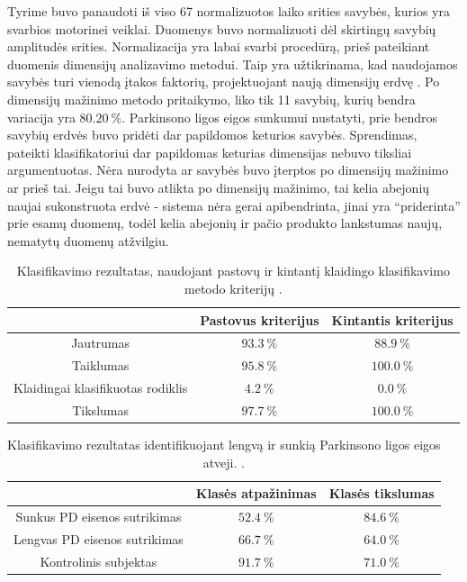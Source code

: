 \documentclass[]{vgtuef}
\begin{document}
Tyrime buvo panaudoti iš viso 67 normalizuotos laiko srities savybės, kurios yra svarbios motorinei veiklai. Duomenys buvo normalizuoti dėl skirtingų savybių amplitudės srities. Normalizacija yra labai svarbi procedūrą, prieš pateikiant duomenis dimensijų analizavimo metodui. Taip yra užtikrinama, kad naudojamos savybės turi vienodą įtakos faktorių, projektuojant naują dimensijų erdvę \cite{824819}. Po dimensijų mažinimo metodo pritaikymo, liko tik 11 savybių, kurių bendra variacija yra $80.20~\%$. Parkinsono ligos eigos sunkumui nustatyti, prie bendros savybių erdvės buvo pridėti dar papildomos keturios savybės. Sprendimas, pateikti klasifikatoriui dar papildomas keturias dimensijas nebuvo tiksliai argumentuotas. Nėra nurodyta ar savybės buvo įterptos po dimensijų mažinimo ar prieš tai. Jeigu tai buvo atlikta po dimensijų mažinimo, tai kelia abejonių naujai sukonstruota erdvė - sistema nėra gerai apibendrinta, jinai yra ``priderinta'' prie esamų duomenų, todėl kelia abejonių ir pačio produkto lankstumas naujų, nematytų duomenų atžvilgiu. 

\begin{table}
	\centering
  \renewcommand{\arraystretch}{1.3}
	\caption{Klasifikavimo rezultatas, naudojant pastovų ir kintantį klaidingo klasifikavimo metodo kriterijų \cite{5627904}.}
	\label{table:wireless_svm_pd_recognition}
	\begin{tabular}{|c|c|c|} \hline
		& Pastovus kriterijus & Kintantis kriterijus \\ \hline
	Jautrumas & $93.3~\%$ & $88.9~\%$ \\ \hline
	Taiklumas & $95.8~\%$ & $100.0~\%$ \\ \hline
	Klaidingai klasifikuotas rodiklis & $4.2~\%$ & $0.0~\%$ \\ \hline
	Tikslumas & $97.7~\%$ & $100.0~\%$ \\ \hline
	\end{tabular}
\end{table}

\begin{table}
	\centering
	\renewcommand{\arraystretch}{1.3}
	\caption{Klasifikavimo rezultatas identifikuojant lengvą ir sunkią Parkinsono ligos eigos atveji. \cite{5627904}.}
	\label{table:wireless_svm_recognition}
	\begin{tabular}{|c|c|c|} \hline
		& Klasės atpažinimas & Klasės tikslumas \\ \hline
	Sunkus PD eisenos sutrikimas & $52.4~\%$ & $84.6~\%$ \\ \hline
	Lengvas PD eisenos sutrikimas & $66.7~\%$ & $64.0~\%$ \\ \hline
	Kontrolinis subjektas & $91.7~\%$ & $71.0~\%$ \\ \hline
	\end{tabular}
\end{table}
\end{document}
